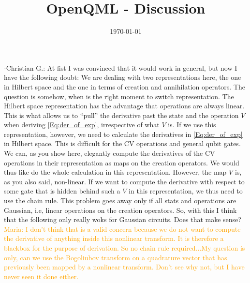 \documentclass[aps,pra,10pt,onecolumn,notitlepage, groupedaddress,nofootinbib]{revtex4-1}
\theoremstyle{plain}
\newcommand{\maria}[1]{\textcolor{orange}{Maria: #1}}
\newcommand{\cg}[1]{\textcolor{cyan!80!black}{Christian G.: #1}}
\begin{document}
\title{OpenQML - Discussion}


\date{\today}

\maketitle

-\cg{At fist I was convinced that it would work in general, but now I have the following doubt: We are dealing with two representations here, the one in Hilbert space and the one in terms of creation and annihilation operators. The question is somehow, when is the right moment to switch representation. The Hilbert space representation has the advantage that operations are always linear. This is what allows us to ``pull'' the derivative past the state and the operation $V$ when deriving \eqref{Eq:der_of_exp}, irrespective of what $V$ is. If we use this representation, however, we need to calculate the derivatives in \eqref{Eq:der_of_exp} in Hilbert space. This is difficult for the CV operations and general qubit gates. We can, as you show here, elegantly compute the derivatives of the CV operations in their representation as maps on the creation operators. We would thus like do the whole calculation in this representation. However, the map $V$ is, as you also said, non-linear. If we want to compute the derivative with respect to some gate that is hidden behind such a $V$ in this representation, we thus need to use the chain rule. This problem goes away only if all stats and operations are Gaussian, i.e, linear operations on the creation operators. So, with this I think that the following only really woks for Gaussian circuits. Does that make sense?}\\

\maria{I don't think that is a valid concern because we do not want to compute the derivative of anything inside this nonlinear transform. It is therefore a blackbox for the purpose of derivation. So no chain rule required...My question is only, can we use the Bogoliubov transform on a quadrature vector that has previously been mapped by a nonlinear transform. Don't see why not, but I have never seen it done either.}\\
\end{document}
